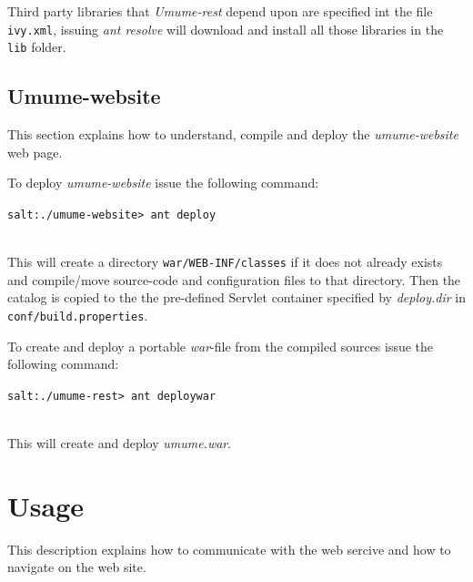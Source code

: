 \documentclass[titlepage, twocolumn, a4paper, 10pt]{article}
\begin{document}
Third party libraries that \textit{Umume-rest} depend upon are
specified int the file \texttt{ivy.xml}, issuing \textit{ant resolve}
will download and install all those libraries in the \texttt{lib} folder.

\subsection{Umume-website}
This section explains how to understand, compile and deploy the
\textit{umume-website} web page.

To deploy \textit{umume-website} issue the following command:\\
\begin{footnotesize}
  \verb!salt:./umume-website> ant deploy!
\end{footnotesize}\\
This will create a directory \verb!war/WEB-INF/classes! if it does not
already exists and compile/move source-code and configuration files to
that directory. Then the catalog is copied to the the pre-defined
Servlet container specified by \textit{deploy.dir} in
\texttt{conf/build.properties}.

To create and deploy a portable \textit{war}-file from the compiled
sources issue the following command:\\
\begin{footnotesize}
  \verb!salt:./umume-rest> ant deploywar!
\end{footnotesize}\\
This will create and deploy \textit{umume.war}.

\section{Usage}\label{sec:usage}

This description explains how to communicate with the web sercive and
how to navigate on the web site.
\end{document}
